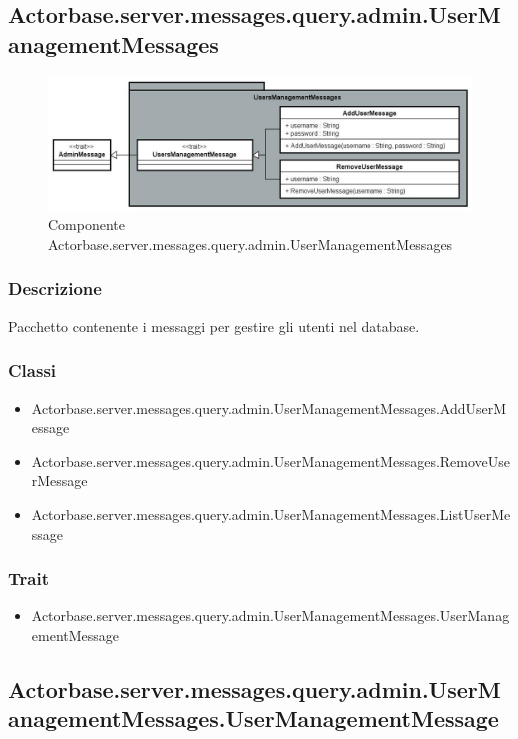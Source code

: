 \documentclass[a4paper]{article}
\begin{document}
		\subsection{Actorbase.server.messages.query.admin.UserManagementMessages}
		
			\begin{figure}[H]
				\centering
				\includegraphics[scale=0.70]{ST/Server/userManagementLevel}
				\caption{Componente Actorbase.server.messages.query.admin.UserManagementMessages}
			\end{figure}
			
			\subsubsection{Descrizione}
				Pacchetto contenente i messaggi per gestire gli utenti nel database.
				
			\subsubsection{Classi}
				\begin{itemize}
					\item Actorbase.server.messages.query.admin.UserManagementMessages.AddUserMessage
					\item Actorbase.server.messages.query.admin.UserManagementMessages.RemoveUserMessage
					\item Actorbase.server.messages.query.admin.UserManagementMessages.ListUserMessage
				\end{itemize}
				
			\subsubsection{Trait}
				\begin{itemize}
					\item Actorbase.server.messages.query.admin.UserManagementMessages.UserManagementMessage
				\end{itemize}
				
		\subsection{Actorbase.server.messages.query.admin.UserManagementMessages.UserManagementMessage}
\end{document}
